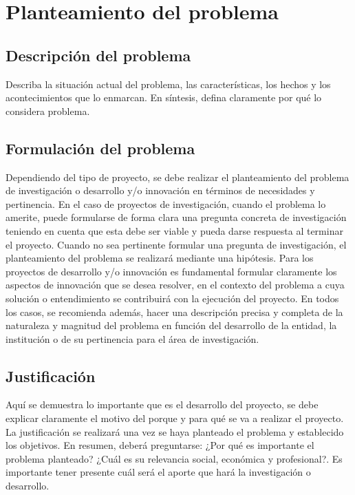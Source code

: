 \chapter{Planteamiento del problema}

\section{Descripción del problema}

Describa la situación actual del problema, las características, los hechos y los
acontecimientos que lo enmarcan.
En síntesis, defina claramente por qué lo considera problema.

\section{Formulación del problema}

Dependiendo del tipo de proyecto, se debe realizar el planteamiento del
problema de investigación o desarrollo y/o innovación en términos de
necesidades y pertinencia. En el caso de proyectos de investigación, cuando el
problema lo amerite, puede formularse de forma clara una pregunta concreta
de investigación teniendo en cuenta que esta debe ser viable y pueda darse
respuesta al terminar el proyecto. Cuando no sea pertinente formular una
pregunta de investigación, el planteamiento del problema se realizará
mediante una hipótesis. Para los proyectos de desarrollo y/o innovación es
fundamental formular claramente los aspectos de innovación que se desea
resolver, en el contexto del problema a cuya solución o entendimiento se
contribuirá con la ejecución del proyecto. En todos los casos, se recomienda
además, hacer una descripción precisa y completa de la naturaleza y magnitud
del problema en función del desarrollo de la entidad, la institución o de su
pertinencia para el área de investigación.

\section{Justificación}  

Aquí se demuestra lo importante que es el desarrollo del proyecto, se debe
explicar claramente el motivo del porque y para qué se va a realizar el proyecto.
La justificación se realizará una vez se haya planteado el problema y establecido
los objetivos. En resumen, deberá preguntarse: ¿Por qué es importante el
problema planteado? ¿Cuál es su relevancia social, económica y profesional?.
Es importante tener presente cuál será el aporte que hará la investigación o
desarrollo.

